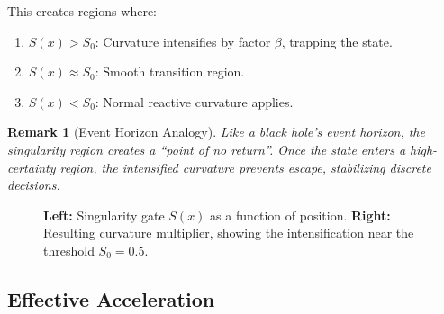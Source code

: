 \documentclass[12pt,letterpaper,twoside]{article}
\newtheorem{remarque}{Remark}[section]
\begin{document}
This creates regions where:
\begin{enumerate}
\item $S(x) > S_0$: Curvature intensifies by factor $\beta$, trapping the state.
\item $S(x) \approx S_0$: Smooth transition region.
\item $S(x) < S_0$: Normal reactive curvature applies.
\end{enumerate}

\begin{remarque}[Event Horizon Analogy]
Like a black hole's event horizon, the singularity region creates a ``point of no return''. Once the state enters a high-certainty region, the intensified curvature prevents escape, stabilizing discrete decisions.
\end{remarque}

\begin{figure}[htbp]
\centering
{}
\hfill
{}
\caption{\textbf{Left:} Singularity gate $S(x)$ as a function of position. \textbf{Right:} Resulting curvature multiplier, showing the intensification near the threshold $S_0 = 0.5$.}
\label{fig:singularity-potential}
\end{figure}

\subsection{Effective Acceleration}
\end{document}

